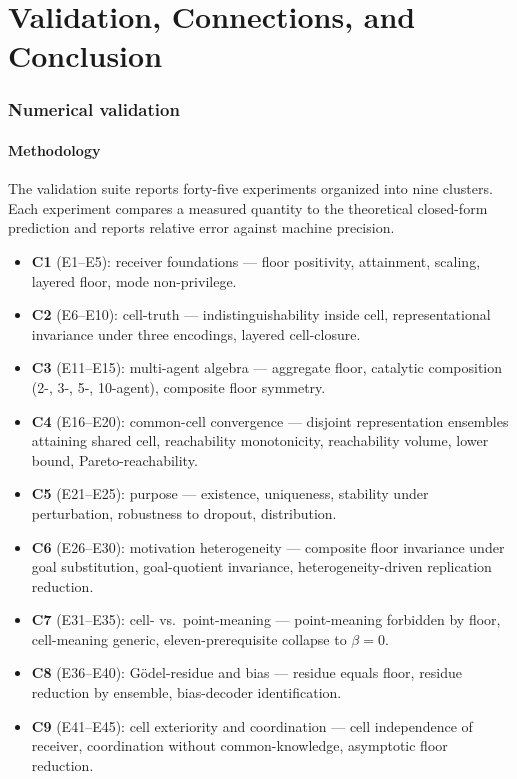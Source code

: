 \documentclass[11pt,twocolumn,a4paper]{article}
\begin{document}
\part{Validation, Connections, and Conclusion}

\section{Numerical validation}
\label{sec:validation}

\subsection{Methodology}

The validation suite reports forty-five experiments organized into
nine clusters. Each experiment compares a measured quantity to the
theoretical closed-form prediction and reports relative error against
machine precision.

\begin{itemize}[leftmargin=*]
\item \textbf{C1} (E1--E5): receiver foundations --- floor positivity,
attainment, scaling, layered floor, mode non-privilege.
\item \textbf{C2} (E6--E10): cell-truth --- indistinguishability inside
cell, representational invariance under three encodings, layered
cell-closure.
\item \textbf{C3} (E11--E15): multi-agent algebra --- aggregate floor,
catalytic composition (2-, 3-, 5-, 10-agent), composite floor symmetry.
\item \textbf{C4} (E16--E20): common-cell convergence --- disjoint
representation ensembles attaining shared cell, reachability
monotonicity, reachability volume, lower bound, Pareto-reachability.
\item \textbf{C5} (E21--E25): purpose --- existence, uniqueness, stability
under perturbation, robustness to dropout, distribution.
\item \textbf{C6} (E26--E30): motivation heterogeneity --- composite
floor invariance under goal substitution, goal-quotient invariance,
heterogeneity-driven replication reduction.
\item \textbf{C7} (E31--E35): cell- vs.\ point-meaning --- point-meaning
forbidden by floor, cell-meaning generic, eleven-prerequisite
collapse to $\beta=0$.
\item \textbf{C8} (E36--E40): Gödel-residue and bias --- residue equals
floor, residue reduction by ensemble, bias-decoder identification.
\item \textbf{C9} (E41--E45): cell exteriority and coordination ---
cell independence of receiver, coordination without common-knowledge,
asymptotic floor reduction.
\end{itemize}
\end{document}
